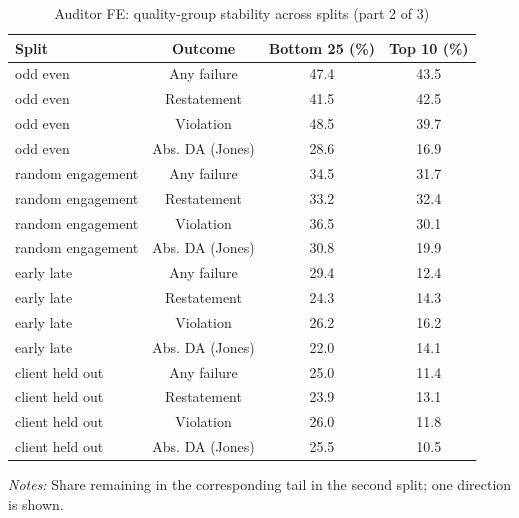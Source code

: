\begin{table}[htbp]
\footnotesize
\centering
\caption{Auditor FE: quality-group stability across splits (part 2 of 3)}
\begin{threeparttable}
\begin{tabular}{p{}ccc}
\toprule
Split & Outcome & Bottom 25 (\%) & Top 10 (\%) \\
\midrule
odd even & Any failure & 47.4 & 43.5 \\
odd even & Restatement & 41.5 & 42.5 \\
odd even & Violation & 48.5 & 39.7 \\
odd even & Abs. DA (Jones) & 28.6 & 16.9 \\
random engagement & Any failure & 34.5 & 31.7 \\
random engagement & Restatement & 33.2 & 32.4 \\
random engagement & Violation & 36.5 & 30.1 \\
random engagement & Abs. DA (Jones) & 30.8 & 19.9 \\
early late & Any failure & 29.4 & 12.4 \\
early late & Restatement & 24.3 & 14.3 \\
early late & Violation & 26.2 & 16.2 \\
early late & Abs. DA (Jones) & 22.0 & 14.1 \\
client held out & Any failure & 25.0 & 11.4 \\
client held out & Restatement & 23.9 & 13.1 \\
client held out & Violation & 26.0 & 11.8 \\
client held out & Abs. DA (Jones) & 25.5 & 10.5 \\
\bottomrule
\end{tabular}
\begin{tablenotes}\footnotesize
\item \raggedright \textit{Notes:} Share remaining in the corresponding tail in the second split; one direction is shown.
\end{tablenotes}
\end{threeparttable}
\end{table}

